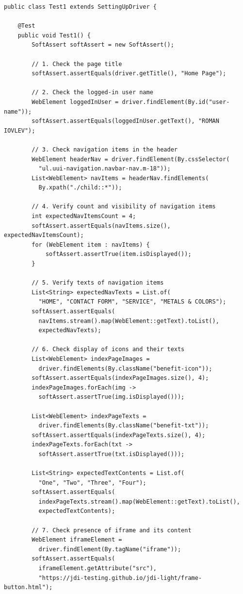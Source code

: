 \documentclass[areasetadvanced]{scrartcl}
\begin{document}
\begin{lstlisting}[caption={Test1}]
public class Test1 extends SettingUpDriver {

    @Test
    public void Test1() {
        SoftAssert softAssert = new SoftAssert();

        // 1. Check the page title
        softAssert.assertEquals(driver.getTitle(), "Home Page");

        // 2. Check the logged-in user name
        WebElement loggedInUser = driver.findElement(By.id("user-name"));
        softAssert.assertEquals(loggedInUser.getText(), "ROMAN IOVLEV");

        // 3. Check navigation items in the header
        WebElement headerNav = driver.findElement(By.cssSelector(
          "ul.uui-navigation.navbar-nav.m-18"));
        List<WebElement> navItems = headerNav.findElements(
          By.xpath("./child::*"));

        // 4. Verify count and visibility of navigation items
        int expectedNavItemsCount = 4;
        softAssert.assertEquals(navItems.size(), expectedNavItemsCount);
        for (WebElement item : navItems) {
            softAssert.assertTrue(item.isDisplayed());
        }

        // 5. Verify texts of navigation items
        List<String> expectedNavTexts = List.of(
          "HOME", "CONTACT FORM", "SERVICE", "METALS & COLORS");
        softAssert.assertEquals(
          navItems.stream().map(WebElement::getText).toList(),
          expectedNavTexts);

        // 6. Check display of icons and their texts
        List<WebElement> indexPageImages =
          driver.findElements(By.className("benefit-icon"));
        softAssert.assertEquals(indexPageImages.size(), 4);
        indexPageImages.forEach(img ->
          softAssert.assertTrue(img.isDisplayed()));

        List<WebElement> indexPageTexts =
          driver.findElements(By.className("benefit-txt"));
        softAssert.assertEquals(indexPageTexts.size(), 4);
        indexPageTexts.forEach(txt ->
          softAssert.assertTrue(txt.isDisplayed()));

        List<String> expectedTextContents = List.of(
          "One", "Two", "Three", "Four");
        softAssert.assertEquals(
          indexPageTexts.stream().map(WebElement::getText).toList(),
          expectedTextContents);

        // 7. Check presence of iframe and its content
        WebElement iframeElement =
          driver.findElement(By.tagName("iframe"));
        softAssert.assertEquals(
          iframeElement.getAttribute("src"),
          "https://jdi-testing.github.io/jdi-light/frame-button.html");


\end{lstlisting}
\end{document}
